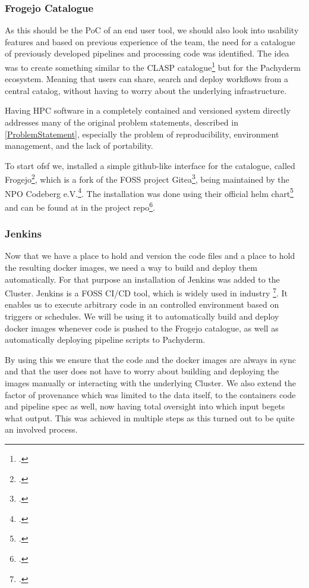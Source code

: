 \subsubsection{Frogejo Catalogue}

As this should be the \ac{PoC} of an end user tool, we should also look into usability features and based on previous experience of the team,
the need for a catalogue of previously developed pipelines and processing code was identified.
The idea was to create something similar to the \ac{CLASP} catalogue\footcite{sayersCLoudApplicationServices2015} but for the Pachyderm ecosystem.
Meaning that users can share, search and deploy workflows from a central catalog, without having to worry about the underlying infrastructure.

Having \ac{HPC} software in a completely contained and versioned system directly addresses many of the original problem statements,
described in \ref{ProblemStatement}, especially the problem of reproducibility, environment management, and the lack of portability.

To start ofsf we, installed a simple github-like interface for the catalogue, called Frogejo\footcite{forgejoForgejo}, which is a fork of the \ac{FOSS} project Gitea\footcite{GiteaGitCup2023},
being maintained by the \ac{NPO} Codeberg e.V.\footcite{codebergCodebergOrg}.
The installation was done using their official helm chart\footcite{Forgejo13Forgejo} and can be found at in the project repo\footcite{Forgejo config}.

\subsubsection{Jenkins}

Now that we have a place to hold and version the code files and a place to hold the resulting docker images, we need a way to build and deploy them automatically.
For that purpose an installation of Jenkins was added to the Cluster. Jenkins is a \ac{FOSS} \ac{CI/CD} tool, which is widely used in industry \footcite{JenkinsMarketShare}.
It enables us to execute arbitrary code in an controlled environment based on triggers or schedules.
We will be using it to automatically build and deploy docker images whenever code is pushed to the Frogejo catalogue, as well as automatically deploying pipeline scripts to Pachyderm.

By using this we ensure that the code and the docker images are always in sync and that the user does not have to worry about building and deploying the images manually or interacting with the underlying Cluster.
We also extend the factor of provenance which was limited to the data itself, to the containers code and pipeline spec as well, now having total oversight into which input begets what output.
This was achieved in multiple steps as this turned out to be quite an involved process.

